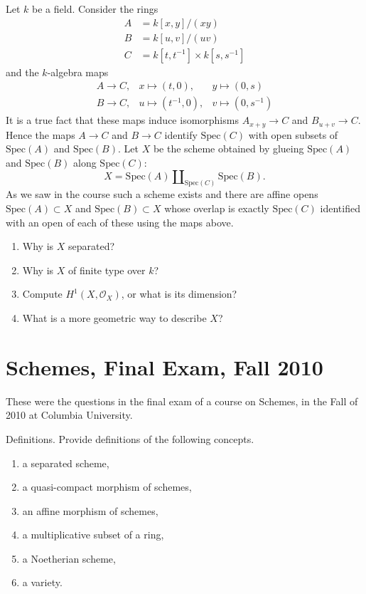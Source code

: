 \begin{exercise}
\label{exercise-glueing}
Let $k$ be a field.
Consider the rings
\begin{align*}
A & = k[x, y]/(xy) \\
B & = k[u, v]/(uv) \\
C & = k[t, t^{-1}] \times k[s, s^{-1}]
\end{align*}
and the $k$-algebra maps
$$
\begin{matrix}
A \longrightarrow C, &
x \mapsto (t, 0), &
y \mapsto (0, s) \\
B \longrightarrow C, &
u \mapsto (t^{-1}, 0), &
v \mapsto (0, s^{-1})
\end{matrix}
$$
It is a true fact that these maps induce isomorphisms
$A_{x + y} \to C$ and $B_{u + v} \to C$. Hence the maps $A \to C$
and $B \to C$ identify $\text{Spec}(C)$ with open subsets of
$\text{Spec}(A)$ and $\text{Spec}(B)$. Let $X$ be the scheme obtained
by glueing $\text{Spec}(A)$ and $\text{Spec}(B)$ along $\text{Spec}(C)$:
$$
X = \text{Spec}(A) \coprod\nolimits_{\text{Spec}(C)} \text{Spec}(B).
$$
As we saw in the course such a scheme exists and there are affine
opens $\text{Spec}(A) \subset X$ and $\text{Spec}(B) \subset X$
whose overlap is exactly $\text{Spec}(C)$ identified with an open of
each of these using the maps above.
\begin{enumerate}
\item Why is $X$ separated?
\item Why is $X$ of finite type over $k$?
\item Compute $H^1(X, \mathcal{O}_X)$, or what is its dimension?
\item What is a more geometric way to describe $X$?
\end{enumerate}
\end{exercise}





\section{Schemes, Final Exam, Fall 2010}
\label{section-final-exam-fall-2010}

\noindent
These were the questions in the final exam of a course on Schemes,
in the Fall of 2010 at Columbia University.

\begin{exercise}
\label{exercise-definitions-fall-2010}
Definitions. Provide definitions of the following concepts.
\begin{enumerate}
\item a separated scheme,
\item a quasi-compact morphism of schemes,
\item an affine morphism of schemes,
\item a multiplicative subset of a ring,
\item a Noetherian scheme,
\item a variety.
\end{enumerate}
\end{exercise}


